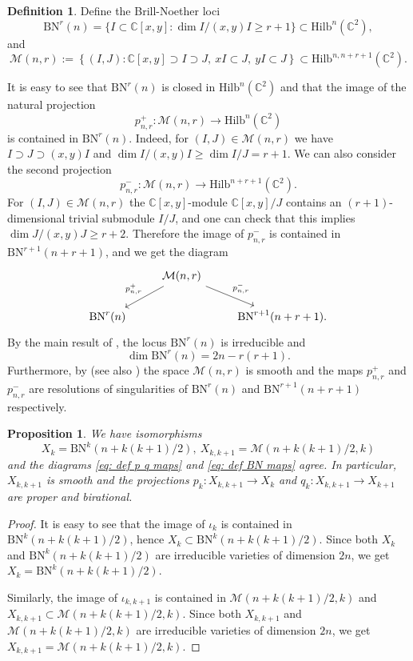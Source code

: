 \documentclass[12pt]{amsart}
\newcommand{\Hilb}{\mathrm{Hilb}}
\newcommand{\C}{\mathbb{C}}
\newcommand{\BN}{\mathrm{BN}}
\numberwithin{equation}{section}
\newtheorem{proposition}[theorem]{Proposition}
\theoremstyle{definition}
\newtheorem{definition}[theorem]{Definition}
\begin{document}
\begin{definition}
Define the Brill-Noether loci
$$
\BN^{r}(n)=\{I\subset \C[x,y]:\dim I/(x,y)I\ge r+1\}\subset \Hilb^n(\C^2),
$$
and
$$
\mathcal{M}(n,r):=\left\{(I,J):\C[x,y]\supset I\supset J,\ xI\subset J,\ yI\subset J\right\}\subset \Hilb^{n,n+r+1}(\C^2).
$$
\end{definition}

It is easy to see that $\BN^r(n)$ is closed in $\Hilb^n(\C^2)$ and that the image of the natural projection 
$$
p^+_{n,r}:\mathcal{M}(n,r)\to \Hilb^n(\C^2)
$$
is contained in $\BN^r(n)$. Indeed, for $(I,J)\in \mathcal{M}(n,r)$ we have $I\supset J\supset (x,y)I$ and $\dim I/(x,y)I\ge \dim I/J=r+1$. We can also consider the second projection
$$
p^-_{n,r}:\mathcal{M}(n,r)\to \Hilb^{n+r+1}(\C^2).
$$
For $(I,J)\in \mathcal{M}(n,r)$ the $\C[x,y]$-module $\C[x,y]/J$ contains an $(r+1)$-dimensional trivial submodule $I/J$, and one can check   \cite[Lemma 3.2]{Bayer} that this implies $\dim J/(x,y)J\ge r+2$. Therefore the image of $p^-_{n,r}$ is contained in $\BN^{r+1}(n+r+1)$, and we get the diagram
\begin{equation}
\label{eq: def BN maps}
\begin{tikzcd}
 & \mathcal{M}(n,r) \arrow[swap]{dl}{p_{n,r}^{+}} \arrow{dr}{p_{n,r}^-} & \\
 \BN^r(n) & & \BN^{r+1}(n+r+1).
\end{tikzcd}
\end{equation}
By the main result of \cite{Bayer}, the locus
$\BN^r(n)$ is irreducible and 
$$
\dim \BN^r(n)=2n-r(r+1).
$$
Furthermore, by \cite[Proposition 3.23]{NY2} (see also \cite{GGS}) the space $\mathcal{M}(n,r)$ is smooth  and the maps $p^+_{n,r}$ and $p^-_{n,r}$ are resolutions of singularities of $\BN^r(n)$ and $\BN^{r+1}(n+r+1)$ respectively.

\begin{proposition}
\label{prop: X as BN}
We have isomorphisms $$X_k=\BN^k(n+k(k+1)/2),\ X_{k,k+1}=\mathcal{M}(n+k(k+1)/2,k)$$
and the diagrams \eqref{eq: def p q maps} and \eqref{eq: def BN maps} agree. In particular, $X_{k,k+1}$ is smooth and the projections $p_k:X_{k,k+1}\to X_k$ and $q_k:X_{k,k+1}\to X_{k+1}$ are proper and birational.
\end{proposition}

\begin{proof}
It is easy to see that the image of $\iota_k$ is contained in $\BN^k(n+k(k+1)/2)$, hence $X_k\subset \BN^k(n+k(k+1)/2)$. Since both $X_k$ and $\BN^k(n+k(k+1)/2)$ are irreducible varieties of dimension $2n$, we get $X_k=\BN^k(n+k(k+1)/2)$. 

Similarly, the image of $\iota_{k,k+1}$ is contained in $\mathcal{M}(n+k(k+1)/2,k)$ and   $X_{k,k+1}\subset \mathcal{M}(n+k(k+1)/2,k)$. Since both $X_{k,k+1}$ and $\mathcal{M}(n+k(k+1)/2,k)$ are irreducible varieties of dimension $2n$, we get $X_{k,k+1}=\mathcal{M}(n+k(k+1)/2,k)$.
\end{proof}
\end{document}

